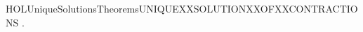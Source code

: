 \newcommand{\HOLUniqueSolutionsTheoremsunfoldingXXlemmaFour}{\UseVerbatim{HOLUniqueSolutionsTheoremsunfoldingXXlemmaFour}}
\begin{SaveVerbatim}{HOLUniqueSolutionsTheoremsUNIQUEXXSOLUTIONXXOFXXCONTRACTIONS}
\HOLTokenTurnstile{} \HOLSymConst{\HOLTokenForall{}}  .
         \HOLSymConst{\HOLTokenConj{}}     \HOLSymConst{\HOLTokenConj{}}     \HOLSymConst{\HOLTokenImp{}}
         
\end{SaveVerbatim}
\newcommand{\HOLUniqueSolutionsTheoremsUNIQUEXXSOLUTIONXXOFXXCONTRACTIONS}{\UseVerbatim{HOLUniqueSolutionsTheoremsUNIQUEXXSOLUTIONXXOFXXCONTRACTIONS}}
